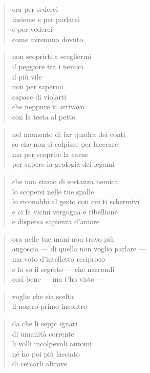 \begin{verse}
    era per sederci\\
    insieme e per parlarci\\
    e per vederci\\
    come avremmo dovuto
\end{verse}

\begin{verse}
    non scoprirti a scegliermi\\
    il peggiore tra i nemici\\
    il più vile\\
    non per sapermi\\
    capace di violarti\\
    che neppure ti arrivavo\\
    con la testa al petto
\end{verse}

\clearpage


\begin{verse}
    nel momento di far quadra dei conti\\
    so che non si colpisce per lacerare\\
    ma per scoprire la carne\\
    per sapere la geologia dei legami
\end{verse}

\begin{verse}
    che non siamo di sostanza nemica\\
    lo scopersi nelle tue spalle\\
    lo riconobbi al gesto con cui ti schermivi\\
    e ci fa vicini vergogna e ribellione\\
    e dispersa sapienza d’amore
\end{verse}

\begin{verse}
    ora nelle tue mani non trovo più\\
    angoscia — di quella non voglio parlare —\\
    ma voto d’intelletto reciproco\\
    e lo so il segreto — che nascondi\\
    così bene — ma t'ho visto —
\end{verse}

\begin{verse}
    voglio che sia scelta\\
    il nostro primo incontro
\end{verse}

\clearpage


\begin{verse}
    da che li seppi ignari\\
    di umanità corrente\\
    li volli incolpevoli automi\\
    né ho poi più lasciato\\
    di cercarli altrove
\end{verse}
